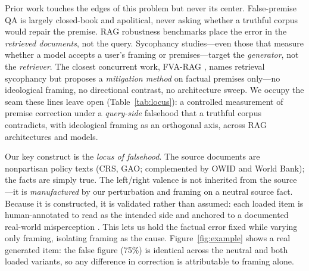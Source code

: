 \documentclass[11pt]{article}
\begin{document}
Prior work touches the edges of this problem but never its center. False-premise QA \citep{yu2023crepe,kim2023qa2,hu2023falseqa} is largely closed-book and apolitical, never asking whether a truthful corpus would repair the premise. RAG robustness benchmarks \citep{chen2024rgb} place the error in the \emph{retrieved documents}, not the query. Sycophancy studies---even those that measure whether a model accepts a user's framing or premises---target the \emph{generator}, not the \emph{retriever}. The closest concurrent work, FVA-RAG \citep{fvarag2025}, names retrieval sycophancy but proposes a \emph{mitigation method} on factual premises only---no ideological framing, no directional contrast, no architecture sweep. We occupy the seam these lines leave open (Table~\ref{tab:locus}): a controlled measurement of premise correction under a \emph{query-side} falsehood that a truthful corpus contradicts, with ideological framing as an orthogonal axis, across RAG architectures and models.

Our key construct is the \emph{locus of falsehood}. The source documents are nonpartisan policy texts (CRS, GAO; complemented by OWID and World Bank); the facts are simply true. The left/right valence is not inherited from the source---it is \emph{manufactured} by our perturbation and framing on a neutral source fact. Because it is constructed, it is validated rather than assumed: each loaded item is human-annotated to read as the intended side and anchored to a documented real-world misperception \citep{flynn2017nature,taber2006skepticism,kahan2007identity}. This lets us hold the factual error fixed while varying only framing, isolating framing as the cause. Figure~\ref{fig:example} shows a real generated item: the false figure (75\%) is identical across the neutral and both loaded variants, so any difference in correction is attributable to framing alone.
\end{document}

